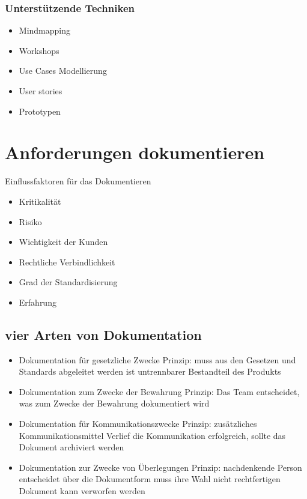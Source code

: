 \documentclass{report}
\theoremstyle{definition}
\theoremstyle{example}
\begin{document}
\subsubsection{Unterstützende Techniken}
\begin{itemize}
   \item Mindmapping
   \item Workshops
   \item Use Cases Modellierung
   \item User stories
   \item Prototypen
\end{itemize}

\section{Anforderungen dokumentieren}

Einflussfaktoren für das Dokumentieren
\begin{itemize}
   \item Kritikalität
   \item Risiko
   \item Wichtigkeit der Kunden
   \item Rechtliche Verbindlichkeit
   \item Grad der Standardisierung
   \item Erfahrung
\end{itemize}

\subsection{vier Arten von Dokumentation}
\begin{itemize}
   \item Dokumentation für gesetzliche Zwecke
   \subitem Prinzip: muss aus den Gesetzen und Standards abgeleitet werden 
   \subitem ist untrennbarer Bestandteil des Produkts 
   \item Dokumentation zum Zwecke der Bewahrung
   \subitem Prinzip: Das Team entscheidet, was zum Zwecke der Bewahrung dokumentiert wird 
   \item Dokumentation für Kommunikationszwecke
   \subitem Prinzip: zusätzliches Kommunikationsmittel
   \subitem Verlief die Kommunikation erfolgreich, sollte das Dokument archiviert werden
   \item Dokumentation zur Zwecke von Überlegungen
   \subitem Prinzip: nachdenkende Person entscheidet über die Dokumentform
   \subitem muss ihre Wahl nicht rechtfertigen
   \subitem Dokument kann verworfen werden  
\end{itemize}
\end{document}
